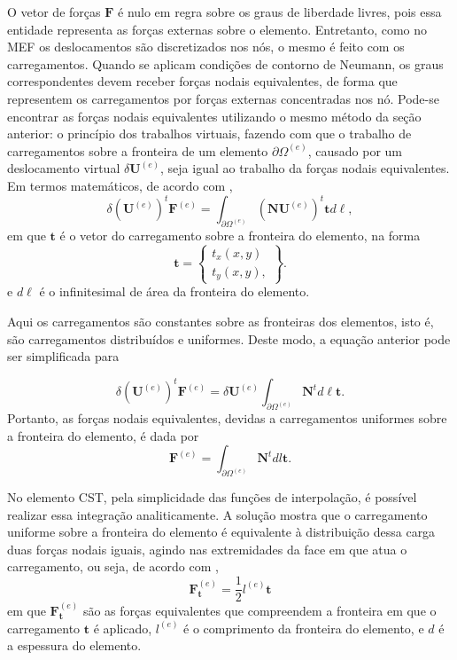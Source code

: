 O vetor de forças $\bm{F}$ é nulo em regra sobre os graus de liberdade livres, pois essa entidade representa as forças externas sobre o elemento. Entretanto, como no MEF os deslocamentos são discretizados nos nós, o mesmo é feito com os carregamentos. Quando se aplicam condições de contorno de Neumann, os graus correspondentes devem receber forças nodais equivalentes, de forma que representem os carregamentos por forças externas concentradas nos nó. Pode-se encontrar as forças nodais equivalentes utilizando o mesmo método da seção anterior: o princípio dos trabalhos virtuais, fazendo com que o trabalho de carregamentos sobre a fronteira de um elemento $\partial \Omega^{(e)}$, causado por um deslocamento virtual $\delta \bm{U}^{(e)}$, seja igual ao trabalho da forças nodais equivalentes. Em termos matemáticos, de acordo com ,
\begin{equation}
    \delta (\bm{U}^{(e)})^t \bm{F}^{(e)} = \int_{\partial \Omega^{(e)}} (\bm{N}\bm{U}^{(e)})^t \bm{t} d \ell,
\end{equation}
em que $\bm{t}$ é o vetor do carregamento sobre a fronteira do elemento, na forma
\begin{equation}
    \bm{t} = \begin{Bmatrix}
        t_x(x,y) \\ t_y(x,y),
    \end{Bmatrix}.
\end{equation}
e $d\ell$ é o infinitesimal de área da fronteira do elemento.

Aqui os carregamentos são constantes sobre as fronteiras dos elementos, isto é, são carregamentos distribuídos e uniformes. Deste modo, a equação anterior pode ser simplificada para

\begin{equation}
    \delta (\bm{U}^{(e)})^t \bm{F}^{(e)} = \delta \bm{U}^{(e)} \int_{\partial \Omega^{(e)}} \bm{N}^t d\ell \bm{t}. 
\end{equation}
Portanto, as forças nodais equivalentes, devidas a carregamentos uniformes sobre a fronteira do elemento, é dada por
\begin{equation}
    \bm{F}^{(e)} = \int_{\partial \Omega^{(e)}} \bm{N}^t dl \bm{t}.
\end{equation}

No elemento CST, pela simplicidade das funções de interpolação, é possível realizar essa integração analiticamente. A solução mostra que o carregamento uniforme sobre a fronteira do elemento é equivalente à distribuição dessa carga duas forças nodais iguais, agindo nas extremidades da face em que atua o carregamento, ou seja, de acordo com \cite{Onate},
\begin{equation}
    \bm{F}^{(e)}_{\bm{t}} = \frac{1}{2} l^{(e)} \bm{t}
\end{equation}
em que $\bm{F}^{(e)}_{\bm{t}}$ são as forças equivalentes que compreendem a fronteira em que o carregamento $\bm{t}$ é aplicado, $l^{(e)}$ é o comprimento da fronteira do elemento, e $d$ é a espessura do elemento.

